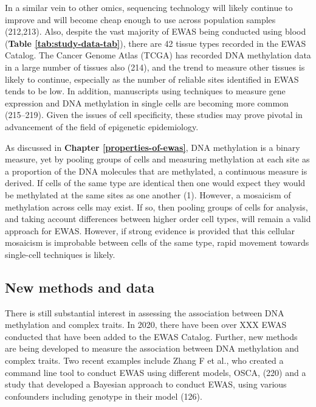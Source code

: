 \documentclass[11pt,oneside]{bristolthesis}
\begin{document}
In a similar vein to other omics, sequencing technology will likely continue to improve and will become cheap enough to use across population samples (212,213). Also, despite the vast majority of EWAS being conducted using blood (\textbf{Table \ref{tab:study-data-tab}}), there are 42 tissue types recorded in the EWAS Catalog. The Cancer Genome Atlas (TCGA) has recorded DNA methylation data in a large number of tissues also (214), and the trend to measure other tissues is likely to continue, especially as the number of reliable sites identified in EWAS tends to be low. In addition, manuscripts using techniques to measure gene expression and DNA methylation in single cells are becoming more common (215--219). Given the issues of cell specificity, these studies may prove pivotal in advancement of the field of epigenetic epidemiology.

As discussed in \textbf{Chapter \ref{properties-of-ewas}}, DNA methylation is a binary measure, yet by pooling groups of cells and measuring methylation at each site as a proportion of the DNA molecules that are methylated, a continuous measure is derived. If cells of the same type are identical then one would expect they would be methylated at the same sites as one another (1). However, a mosaicism of methylation across cells may exist. If so, then pooling groups of cells for analysis, and taking account differences between higher order cell types, will remain a valid approach for EWAS. However, if strong evidence is provided that this cellular mosaicism is improbable between cells of the same type, rapid movement towards single-cell techniques is likely.

\hypertarget{new-methods-and-data}{%
\subsection{New methods and data}\label{new-methods-and-data}}

There is still substantial interest in assessing the association between DNA methylation and complex traits. In 2020, there have been over XXX EWAS conducted that have been added to the EWAS Catalog. Further, new methods are being developed to measure the association between DNA methylation and complex traits. Two recent examples include Zhang F et al., who created a command line tool to conduct EWAS using different models, OSCA, (220) and a study that developed a Bayesian approach to conduct EWAS, using various confounders including genotype in their model (126).
\end{document}
